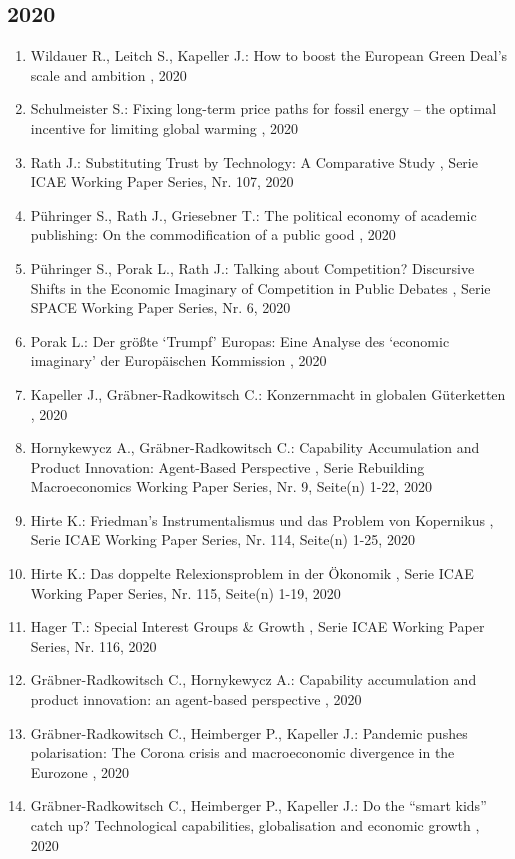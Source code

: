  \subsection*{2020} 
 \begin{enumerate}[leftmargin=*, labelsep=0.5cm] 
	 \item Wildauer R., Leitch S., Kapeller J.:  How to boost the European Green Deal’s scale and ambition  , 2020
	 \item Schulmeister S.:  Fixing long-term price paths for fossil energy – the optimal incentive for limiting global warming  , 2020
	 \item Rath J.:  Substituting Trust by Technology: A Comparative Study  , Serie ICAE Working Paper Series, Nr. 107, 2020
	 \item Pühringer S., Rath J., Griesebner T.:  The political economy of academic publishing: On the commodification of a public good  , 2020
	 \item Pühringer S., Porak L., Rath J.:  Talking about Competition? Discursive Shifts in the Economic Imaginary of Competition in Public Debates  , Serie SPACE Working Paper Series, Nr. 6, 2020
	 \item Porak L.:  Der größte ‘Trumpf’ Europas: Eine Analyse des ‘economic imaginary’ der Europäischen Kommission  , 2020
	 \item Kapeller J., Gräbner-Radkowitsch C.:  Konzernmacht in globalen Güterketten  , 2020
	 \item Hornykewycz A., Gräbner-Radkowitsch C.:  Capability Accumulation and Product Innovation: Agent-Based Perspective  , Serie Rebuilding Macroeconomics Working Paper Series, Nr. 9, Seite(n) 1-22, 2020
	 \item Hirte K.:  Friedman’s Instrumentalismus und das Problem von Kopernikus  , Serie ICAE Working Paper Series, Nr. 114, Seite(n) 1-25, 2020
	 \item Hirte K.:  Das doppelte Relexionsproblem in der Ökonomik  , Serie ICAE Working Paper Series, Nr. 115, Seite(n) 1-19, 2020
	 \item Hager T.:  Special Interest Groups & Growth  , Serie ICAE Working Paper Series, Nr. 116, 2020
	 \item Gräbner-Radkowitsch C., Hornykewycz A.:  Capability accumulation and product innovation: an agent-based perspective  , 2020
	 \item Gräbner-Radkowitsch C., Heimberger P., Kapeller J.:  Pandemic pushes polarisation: The Corona crisis and macroeconomic divergence in the Eurozone  , 2020
	 \item Gräbner-Radkowitsch C., Heimberger P., Kapeller J.:  Do the “smart kids” catch up? Technological capabilities, globalisation and economic growth  , 2020

\end{enumerate}
